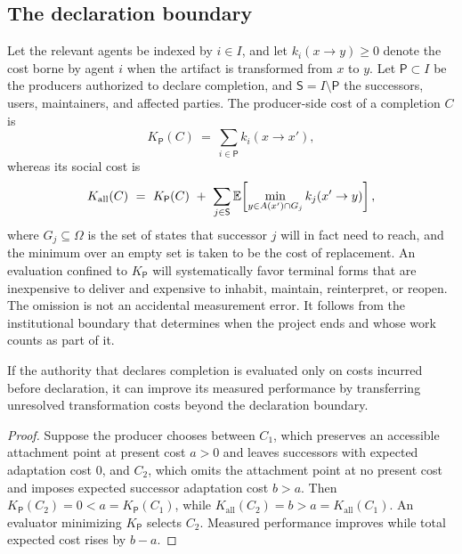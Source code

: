 \subsection{The declaration boundary}

Let the relevant agents be indexed by $i\in I$, and let $k_i(x\to y)\geq 0$ denote the cost borne by agent $i$ when the artifact is transformed from $x$ to $y$. Let $\mathsf{P}\subset I$ be the producers authorized to declare completion, and $\mathsf{S}=I\setminus\mathsf{P}$ the successors, users, maintainers, and affected parties. The producer-side cost of a completion $C$ is
\begin{equation}
K_{\mathsf{P}}(C)\ =\ \sum_{i\in\mathsf{P}}k_i(x\to x'),
\end{equation}
whereas its social cost is
\begin{equation}\label{eq:social-cost}
K_{\mathrm{all}}(C)\ =\ K_{\mathsf{P}}(C)\ +\ \sum_{j\in\mathsf{S}}\E\!\left[\min_{y\in A(x')\cap G_j}k_j(x'\to y)\right],
\end{equation}
where $G_j\subseteq\Omega$ is the set of states that successor $j$ will in fact need to reach, and the minimum over an empty set is taken to be the cost of replacement. An evaluation confined to $K_{\mathsf{P}}$ will systematically favor terminal forms that are inexpensive to deliver and expensive to inhabit, maintain, reinterpret, or reopen. The omission is not an accidental measurement error. It follows from the institutional boundary that determines when the project ends and whose work counts as part of it.

\begin{observation}\label{obs:boundary}
If the authority that declares completion is evaluated only on costs incurred before declaration, it can improve its measured performance by transferring unresolved transformation costs beyond the declaration boundary.
\end{observation}

\begin{proof}
Suppose the producer chooses between $C_1$, which preserves an accessible attachment point at present cost $a>0$ and leaves successors with expected adaptation cost $0$, and $C_2$, which omits the attachment point at no present cost and imposes expected successor adaptation cost $b>a$. Then $K_{\mathsf{P}}(C_2)=0<a=K_{\mathsf{P}}(C_1)$, while $K_{\mathrm{all}}(C_2)=b>a=K_{\mathrm{all}}(C_1)$. An evaluator minimizing $K_{\mathsf{P}}$ selects $C_2$. Measured performance improves while total expected cost rises by $b-a$.
\end{proof}

